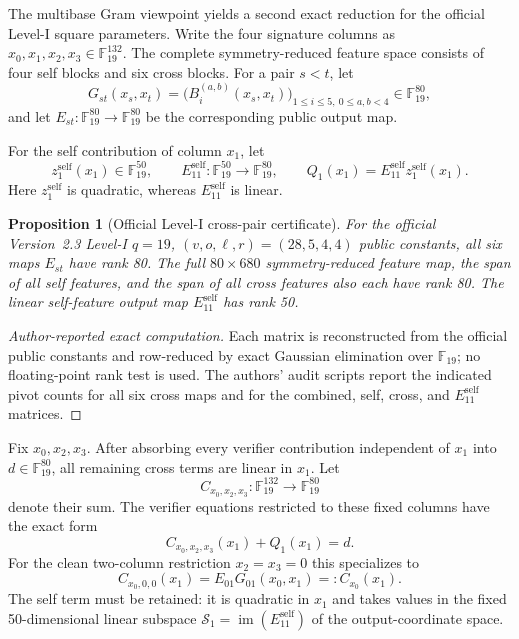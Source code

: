 \documentclass[11pt]{article}
\newtheorem{proposition}[theorem]{Proposition}
\newcommand{\F}{\mathbb F}
\begin{document}
The multibase Gram viewpoint yields a second exact reduction for the official Level-I square parameters.  Write the four signature columns as $x_0,x_1,x_2,x_3\in\F_{19}^{132}$.  The complete symmetry-reduced feature space consists of four self blocks and six cross blocks.  For a pair $s<t$, let
\[
 G_{st}(x_s,x_t)
 =\bigl(B_i^{(a,b)}(x_s,x_t)\bigr)_{1\le i\le5,\ 0\le a,b<4}
 \in\F_{19}^{80},
\]
and let $E_{st}:\F_{19}^{80}\to\F_{19}^{80}$ be the corresponding public output map.

For the self contribution of column $x_1$, let
\[
 z_1^{\mathrm{self}}(x_1)\in\F_{19}^{50},
 \qquad
 E_{11}^{\mathrm{self}}:\F_{19}^{50}\longrightarrow\F_{19}^{80},
 \qquad
 Q_1(x_1)=E_{11}^{\mathrm{self}}z_1^{\mathrm{self}}(x_1).
\]
Here $z_1^{\mathrm{self}}$ is quadratic, whereas
$E_{11}^{\mathrm{self}}$ is linear.

\begin{proposition}[Official Level-I cross-pair certificate]\label{prop:crosspair}
For the official Version~2.3 Level-I $q=19$,
$(v,o,\ell,r)=(28,5,4,4)$ public constants, all six maps $E_{st}$ have rank
80.  The full $80\times680$ symmetry-reduced feature map, the span of all self
features, and the span of all cross features also each have rank 80.  The
linear self-feature output map $E_{11}^{\mathrm{self}}$ has rank 50.
\end{proposition}

\begin{proof}[Author-reported exact computation]
Each matrix is reconstructed from the official public constants and
row-reduced by exact Gaussian elimination over $\F_{19}$; no floating-point
rank test is used.  The authors' audit scripts report the indicated pivot counts
for all six cross maps and for the combined, self, cross, and
$E_{11}^{\mathrm{self}}$ matrices.
\end{proof}

Fix $x_0,x_2,x_3$.  After absorbing every verifier contribution
independent of $x_1$ into $d\in\F_{19}^{80}$, all remaining cross terms are
linear in $x_1$.  Let
\[
 C_{x_0,x_2,x_3}:\F_{19}^{132}\longrightarrow\F_{19}^{80}
\]
denote their sum.  The verifier equations restricted to these fixed columns
have the exact form
\begin{equation}\label{eq:cross-fiber}
 C_{x_0,x_2,x_3}(x_1)+Q_1(x_1)=d.
\end{equation}
For the clean two-column restriction $x_2=x_3=0$ this specializes to
\[
 C_{x_0,0,0}(x_1)=E_{01}G_{01}(x_0,x_1)=:C_{x_0}(x_1).
\]
The self term must be retained: it is quadratic in $x_1$ and takes values in
the fixed 50-dimensional linear subspace
$\mathcal S_1=\operatorname{im}(E_{11}^{\mathrm{self}})$ of the
output-coordinate space.
\end{document}
